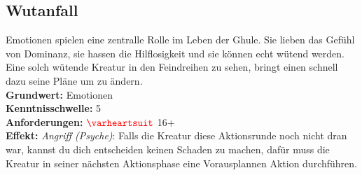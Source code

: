 \subsection*{Wutanfall} \label{sk:wutanfall}
Emotionen spielen eine zentralle Rolle im Leben der Ghule. Sie lieben das Gefühl von Dominanz, sie hassen die Hilflosigkeit und sie können echt wütend werden. Eine solch wütende Kreatur in den Feindreihen zu sehen, bringt einen schnell dazu seine Pläne um zu ändern. \\
\textbf{Grundwert:} Emotionen \\
\textbf{Kenntnisschwelle:} 5 \\
\textbf{Anforderungen:} $\Herz{}$ 16+ \\
\textbf{Effekt:} \textit{Angriff (Psyche)}: Falls die Kreatur diese Aktionsrunde noch nicht dran war, kannst du dich entscheiden keinen Schaden zu machen, dafür muss die Kreatur in seiner nächsten Aktionsphase eine Vorausplannen Aktion durchführen. 



